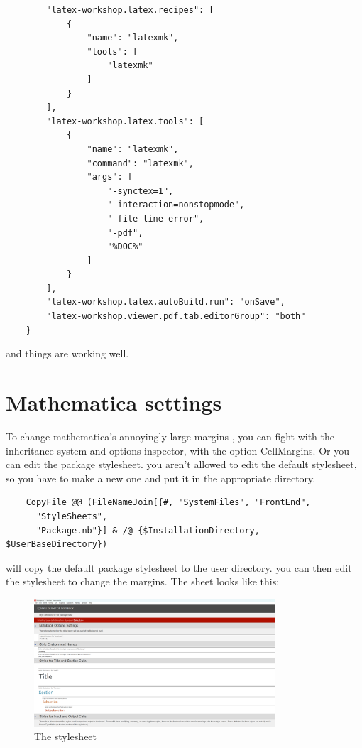 \documentclass[../../main.tex]{subfiles} %
\begin{document}
\begin{lstlisting}
        "latex-workshop.latex.recipes": [
            {
                "name": "latexmk",
                "tools": [
                    "latexmk"
                ]
            }
        ],
        "latex-workshop.latex.tools": [
            {
                "name": "latexmk",
                "command": "latexmk",
                "args": [
                    "-synctex=1",
                    "-interaction=nonstopmode",
                    "-file-line-error",
                    "-pdf",
                    "%DOC%"
                ]
            }
        ],
        "latex-workshop.latex.autoBuild.run": "onSave",
        "latex-workshop.viewer.pdf.tab.editorGroup": "both"
    }
\end{lstlisting}

and things are working well.

\section{Mathematica settings}
To change mathematica's annoyingly large margins , you can fight with the inheritance system and options inspector, with the option CellMargins. Or you can edit the package stylesheet. you aren't allowed to edit the default stylesheet, so you have to make a new one and put it in the appropriate directory.

\begin{lstlisting}
    CopyFile @@ (FileNameJoin[{#, "SystemFiles", "FrontEnd", 
      "StyleSheets", 
      "Package.nb"}] & /@ {$InstallationDirectory, $UserBaseDirectory})
\end{lstlisting}

will copy the default package stylesheet to the user directory. you can then edit the stylesheet to change the margins. The sheet looks like this:


\begin{figure}[H]
    \centering
    \includegraphics[width=0.8\textwidth]{Chapters/intro/stylesheet.png}
    \caption{The stylesheet}
    \label{fig:stylesheet}
\end{figure}
\end{document}
